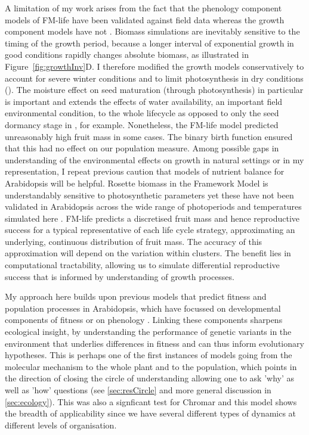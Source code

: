 A limitation of my work arises from the fact that the phenology component models
of FM-life have been validated against field data
\citep{wilczek_effects_2009,burghardt_modeling_2015} whereas the growth
component models have not
\citep{rasse_leaf_2006,christophe_model-based_2008}. Biomass simulations are
inevitably sensitive to the timing of the growth period, because a longer
interval of exponential growth in good conditions rapidly changes absolute
biomass, as illustrated in Figure~\ref{fig:growthInv}D. I therefore modified the
growth models conservatively to account for severe winter conditions and to
limit photosynthesis in dry conditions (). The moisture effect on
seed maturation (through photosynthesis) in particular is important and extends
the effects of water availability, an important field environmental condition,
to the whole lifecycle as opposed to only the seed dormancy stage in
\citep{burghardt_modeling_2015}, for example. Nonetheless, the FM-life model
predicted unreasonably high fruit mass in some cases. The binary birth function
ensured that this had no effect on our population measure. Among possible gaps
in understanding of the environmental effects on growth in natural settings or
in my representation, I repeat previous caution \citep{chew_multiscale_2014,
  chew_linking_2017} that models of nutrient balance for Arabidopsis will be
helpful. Rosette biomass in the Framework Model is understandably sensitive to
photosynthetic parameters \citep{chew_multiscale_2014} yet these have not been
validated in Arabidopsis across the wide range of photoperiods and temperatures
simulated here \citep{walker_temperature_2013}. FM-life predicts a discretised
fruit mass and hence reproductive success for a typical representative of each
life cycle strategy, approximating an underlying, continuous distribution of
fruit mass. The accuracy of this approximation will depend on the variation
within clusters. The benefit lies in computational tractability, allowing us to
simulate differential reproductive success that is informed by understanding of
growth processes.

My approach here builds upon previous models that predict fitness and population
processes in Arabidopsis, which have focussed on developmental components of
fitness or on phenology
\citep{prusinkiewicz_evolution_2007,satake_forecasting_2013,springthorpe_flowering_2015}. Linking
these components sharpens ecological insight, by understanding the performance
of genetic variants in the environment that underlies differences in fitness
\citep[see discussions in][]{burghardt_modeling_2015, doebeli_towards_2017} and
can thus inform evolutionary hypotheses. This is perhaps one of the first
instances of models going from the molecular mechanism to the whole plant and to
the population, which points in the direction of closing the circle of
understanding allowing one to ask 'why' as well as 'how' questions (see
\ref{sec:resCircle} and more general discussion in \ref{sec:ecology}). This was
also a signficant test for Chromar and this model shows the breadth of
applicability since we have several different types of dynamics at different
levels of organisation.

